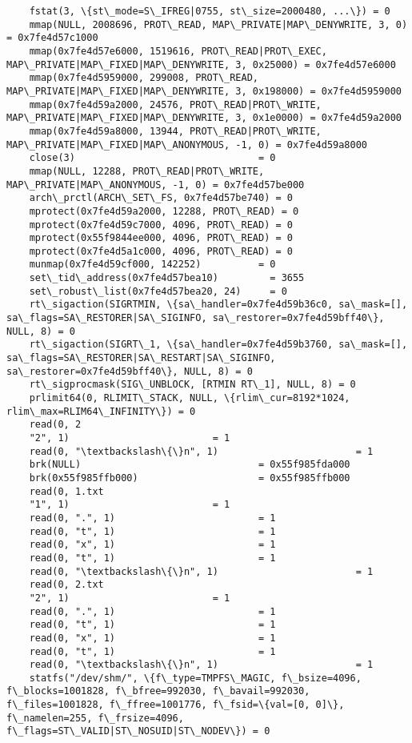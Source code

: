 \documentclass[a4paper, 12pt]{article}
\begin{document}
\begin{verbatim}
	fstat(3, \{st\_mode=S\_IFREG|0755, st\_size=2000480, ...\}) = 0
	mmap(NULL, 2008696, PROT\_READ, MAP\_PRIVATE|MAP\_DENYWRITE, 3, 0) = 0x7fe4d57c1000
	mmap(0x7fe4d57e6000, 1519616, PROT\_READ|PROT\_EXEC, MAP\_PRIVATE|MAP\_FIXED|MAP\_DENYWRITE, 3, 0x25000) = 0x7fe4d57e6000
	mmap(0x7fe4d5959000, 299008, PROT\_READ, MAP\_PRIVATE|MAP\_FIXED|MAP\_DENYWRITE, 3, 0x198000) = 0x7fe4d5959000
	mmap(0x7fe4d59a2000, 24576, PROT\_READ|PROT\_WRITE, MAP\_PRIVATE|MAP\_FIXED|MAP\_DENYWRITE, 3, 0x1e0000) = 0x7fe4d59a2000
	mmap(0x7fe4d59a8000, 13944, PROT\_READ|PROT\_WRITE, MAP\_PRIVATE|MAP\_FIXED|MAP\_ANONYMOUS, -1, 0) = 0x7fe4d59a8000
	close(3)                                = 0
	mmap(NULL, 12288, PROT\_READ|PROT\_WRITE, MAP\_PRIVATE|MAP\_ANONYMOUS, -1, 0) = 0x7fe4d57be000
	arch\_prctl(ARCH\_SET\_FS, 0x7fe4d57be740) = 0
	mprotect(0x7fe4d59a2000, 12288, PROT\_READ) = 0
	mprotect(0x7fe4d59c7000, 4096, PROT\_READ) = 0
	mprotect(0x55f9844ee000, 4096, PROT\_READ) = 0
	mprotect(0x7fe4d5a1c000, 4096, PROT\_READ) = 0
	munmap(0x7fe4d59cf000, 142252)          = 0
	set\_tid\_address(0x7fe4d57bea10)         = 3655
	set\_robust\_list(0x7fe4d57bea20, 24)     = 0
	rt\_sigaction(SIGRTMIN, \{sa\_handler=0x7fe4d59b36c0, sa\_mask=[], sa\_flags=SA\_RESTORER|SA\_SIGINFO, sa\_restorer=0x7fe4d59bff40\}, NULL, 8) = 0
	rt\_sigaction(SIGRT\_1, \{sa\_handler=0x7fe4d59b3760, sa\_mask=[], sa\_flags=SA\_RESTORER|SA\_RESTART|SA\_SIGINFO, sa\_restorer=0x7fe4d59bff40\}, NULL, 8) = 0
	rt\_sigprocmask(SIG\_UNBLOCK, [RTMIN RT\_1], NULL, 8) = 0
	prlimit64(0, RLIMIT\_STACK, NULL, \{rlim\_cur=8192*1024, rlim\_max=RLIM64\_INFINITY\}) = 0
	read(0, 2
	"2", 1)                         = 1
	read(0, "\textbackslash\{\}n", 1)                        = 1
	brk(NULL)                               = 0x55f985fda000
	brk(0x55f985ffb000)                     = 0x55f985ffb000
	read(0, 1.txt
	"1", 1)                         = 1
	read(0, ".", 1)                         = 1
	read(0, "t", 1)                         = 1
	read(0, "x", 1)                         = 1
	read(0, "t", 1)                         = 1
	read(0, "\textbackslash\{\}n", 1)                        = 1
	read(0, 2.txt
	"2", 1)                         = 1
	read(0, ".", 1)                         = 1
	read(0, "t", 1)                         = 1
	read(0, "x", 1)                         = 1
	read(0, "t", 1)                         = 1
	read(0, "\textbackslash\{\}n", 1)                        = 1
	statfs("/dev/shm/", \{f\_type=TMPFS\_MAGIC, f\_bsize=4096, f\_blocks=1001828, f\_bfree=992030, f\_bavail=992030, f\_files=1001828, f\_ffree=1001776, f\_fsid=\{val=[0, 0]\}, f\_namelen=255, f\_frsize=4096, f\_flags=ST\_VALID|ST\_NOSUID|ST\_NODEV\}) = 0

\end{verbatim}
\end{document}

